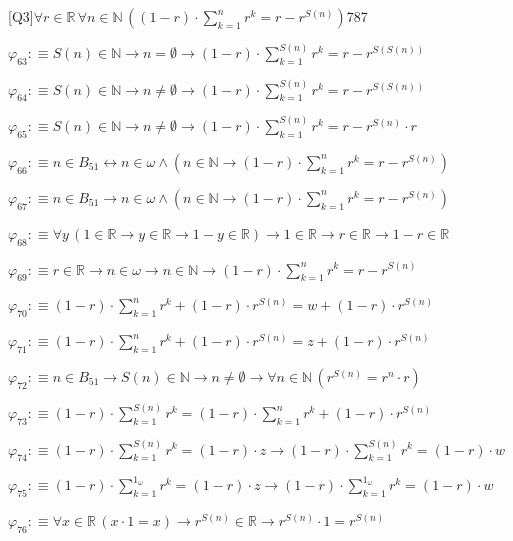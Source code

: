 \begin{fullproof}{[Q3]}{$\forall r \in \mathbb{R}\,\forall n \in \mathbb{N}\,((1 - r) \cdot {\textstyle\sum_{k=1}^{n} {{r}^{k}}} = r - {{r}^{S(n)}})$}{787}
\begin{abbrevlist}
\item $\varphi_{63} :\equiv S(n) \in \mathbb{N} \to n = \emptyset \to (1 - r) \cdot {\textstyle\sum_{k=1}^{S(n)} {{r}^{k}}} = r - {{r}^{S(S(n))}}$
\item $\varphi_{64} :\equiv S(n) \in \mathbb{N} \to n \neq \emptyset \to (1 - r) \cdot {\textstyle\sum_{k=1}^{S(n)} {{r}^{k}}} = r - {{r}^{S(S(n))}}$
\item $\varphi_{65} :\equiv S(n) \in \mathbb{N} \to n \neq \emptyset \to (1 - r) \cdot {\textstyle\sum_{k=1}^{S(n)} {{r}^{k}}} = r - {{r}^{S(n)}} \cdot r$
\item $\varphi_{66} :\equiv n \in B_{51} \leftrightarrow n \in \omega \land (n \in \mathbb{N} \to (1 - r) \cdot {\textstyle\sum_{k=1}^{n} {{r}^{k}}} = r - {{r}^{S(n)}})$
\item $\varphi_{67} :\equiv n \in B_{51} \to n \in \omega \land (n \in \mathbb{N} \to (1 - r) \cdot {\textstyle\sum_{k=1}^{n} {{r}^{k}}} = r - {{r}^{S(n)}})$
\item $\varphi_{68} :\equiv \forall y\,(1 \in \mathbb{R} \to y \in \mathbb{R} \to 1 - y \in \mathbb{R}) \to 1 \in \mathbb{R} \to r \in \mathbb{R} \to 1 - r \in \mathbb{R}$
\item $\varphi_{69} :\equiv r \in \mathbb{R} \to n \in \omega \to n \in \mathbb{N} \to (1 - r) \cdot {\textstyle\sum_{k=1}^{n} {{r}^{k}}} = r - {{r}^{S(n)}}$
\item $\varphi_{70} :\equiv (1 - r) \cdot {\textstyle\sum_{k=1}^{n} {{r}^{k}}} + (1 - r) \cdot {{r}^{S(n)}} = w + (1 - r) \cdot {{r}^{S(n)}}$
\item $\varphi_{71} :\equiv (1 - r) \cdot {\textstyle\sum_{k=1}^{n} {{r}^{k}}} + (1 - r) \cdot {{r}^{S(n)}} = z + (1 - r) \cdot {{r}^{S(n)}}$
\item $\varphi_{72} :\equiv n \in B_{51} \to S(n) \in \mathbb{N} \to n \neq \emptyset \to \forall n \in \mathbb{N}\,({{r}^{S(n)}} = {{r}^{n}} \cdot r)$
\item $\varphi_{73} :\equiv (1 - r) \cdot {\textstyle\sum_{k=1}^{S(n)} {{r}^{k}}} = (1 - r) \cdot {\textstyle\sum_{k=1}^{n} {{r}^{k}}} + (1 - r) \cdot {{r}^{S(n)}}$
\item $\varphi_{74} :\equiv (1 - r) \cdot {\textstyle\sum_{k=1}^{S(n)} {{r}^{k}}} = (1 - r) \cdot z \to (1 - r) \cdot {\textstyle\sum_{k=1}^{S(n)} {{r}^{k}}} = (1 - r) \cdot w$
\item $\varphi_{75} :\equiv (1 - r) \cdot {\textstyle\sum_{k=1}^{1_{\omega}} {{r}^{k}}} = (1 - r) \cdot z \to (1 - r) \cdot {\textstyle\sum_{k=1}^{1_{\omega}} {{r}^{k}}} = (1 - r) \cdot w$
\item $\varphi_{76} :\equiv \forall x \in \mathbb{R}\,(x \cdot 1 = x) \to {{r}^{S(n)}} \in \mathbb{R} \to {{r}^{S(n)}} \cdot 1 = {{r}^{S(n)}}$

\end{abbrevlist}
\end{fullproof}

